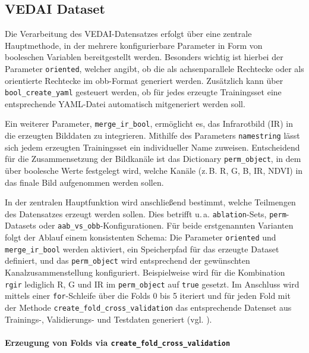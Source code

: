 \subsection{VEDAI Dataset}


Die Verarbeitung des \acrshort{VEDAI}-Datensatzes erfolgt über eine zentrale Hauptmethode, in der mehrere konfigurierbare Parameter in Form von booleschen Variablen bereitgestellt werden. Besonders wichtig ist hierbei der Parameter \texttt{oriented}, welcher angibt, ob die  als achsenparallele Rechtecke oder als orientierte Rechtecke im \acrshort{obb}-Format generiert werden. Zusätzlich kann über \texttt{bool\_create\_yaml} gesteuert werden, ob für jedes erzeugte Trainingsset eine entsprechende \acrshort{YAML}-Datei automatisch mitgeneriert werden soll.

Ein weiterer Parameter, \texttt{merge\_ir\_bool}, ermöglicht es, das Infrarotbild (IR) in die erzeugten Bilddaten zu integrieren. Mithilfe des Parameters \texttt{namestring} lässt sich jedem erzeugten Trainingsset ein individueller Name zuweisen. Entscheidend für die Zusammensetzung der Bildkanäle ist das Dictionary \texttt{perm\_object}, in dem über boolesche Werte festgelegt wird, welche Kanäle (z.\,B. \acrshort{R}, \acrshort{G}, \acrshort{B}, \acrshort{IR}, \acrshort{NDVI}) in das finale Bild aufgenommen werden sollen.

In der zentralen Hauptfunktion wird anschließend bestimmt, welche Teilmengen des Datensatzes erzeugt werden sollen. Dies betrifft u.\,a. \texttt{ablation}-Sets, \texttt{perm}-Datasets oder \texttt{aab\_vs\_obb}-Konfigurationen. Für beide erstgenannten Varianten folgt der Ablauf einem konsistenten Schema: Die Parameter \texttt{oriented} und \texttt{merge\_ir\_bool} werden aktiviert, ein Speicherpfad für das erzeugte Dataset definiert, und das \texttt{perm\_object} wird entsprechend der gewünschten Kanalzusammenstellung konfiguriert. Beispielweise wird für die Kombination \texttt{rgir} lediglich \acrshort{R}, \acrshort{G} und \acrshort{IR} im \texttt{perm\_object} auf \texttt{true} gesetzt. Im Anschluss wird mittels einer \texttt{for}-Schleife über die Folds 0 bis 5 iteriert und für jeden Fold mit der Methode \texttt{create\_fold\_cross\_validation} das entsprechende Datenset aus Trainings-, Validierungs- und Testdaten generiert (vgl. ).

\paragraph{Erzeugung von Folds via \texttt{create\_fold\_cross\_validation}}

